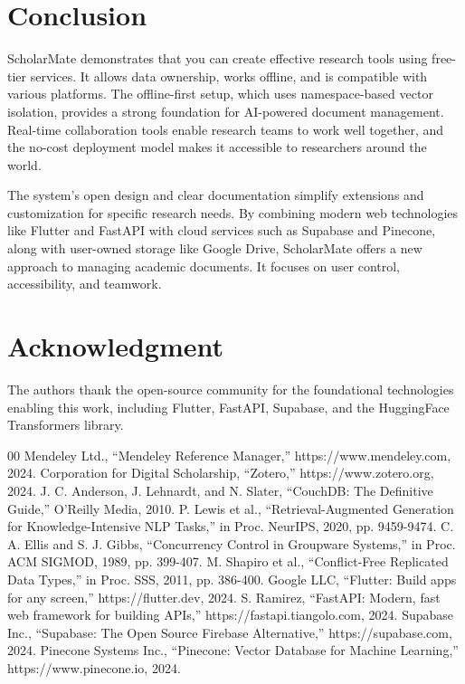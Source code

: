 \documentclass[conference]{IEEEtran}
\begin{document}
\section{Conclusion}

ScholarMate demonstrates that you can create effective research tools using free-tier services. It allows data ownership, works offline, and is compatible with various platforms. The offline-first setup, which uses namespace-based vector isolation, provides a strong foundation for AI-powered document management. Real-time collaboration tools enable research teams to work well together, and the no-cost deployment model makes it accessible to researchers around the world.

The system's open design and clear documentation simplify extensions and customization for specific research needs. By combining modern web technologies like Flutter and FastAPI with cloud services such as Supabase and Pinecone, along with user-owned storage like Google Drive, ScholarMate offers a new approach to managing academic documents. It focuses on user control, accessibility, and teamwork.

\section*{Acknowledgment}

The authors thank the open-source community for the foundational technologies enabling this work, including Flutter, FastAPI, Supabase, and the HuggingFace Transformers library.

\begin{thebibliography}{00}
 Mendeley Ltd., ``Mendeley Reference Manager,'' https://www.mendeley.com, 2024.
 Corporation for Digital Scholarship, ``Zotero,'' https://www.zotero.org, 2024.
 J. C. Anderson, J. Lehnardt, and N. Slater, ``CouchDB: The Definitive Guide,'' O'Reilly Media, 2010.
 P. Lewis et al., ``Retrieval-Augmented Generation for Knowledge-Intensive NLP Tasks,'' in Proc. NeurIPS, 2020, pp. 9459-9474.
 C. A. Ellis and S. J. Gibbs, ``Concurrency Control in Groupware Systems,'' in Proc. ACM SIGMOD, 1989, pp. 399-407.
 M. Shapiro et al., ``Conflict-Free Replicated Data Types,'' in Proc. SSS, 2011, pp. 386-400.
 Google LLC, ``Flutter: Build apps for any screen,'' https://flutter.dev, 2024.
 S. Ramirez, ``FastAPI: Modern, fast web framework for building APIs,'' https://fastapi.tiangolo.com, 2024.
 Supabase Inc., ``Supabase: The Open Source Firebase Alternative,'' https://supabase.com, 2024.
 Pinecone Systems Inc., ``Pinecone: Vector Database for Machine Learning,'' https://www.pinecone.io, 2024.
\end{thebibliography}
\end{document}
